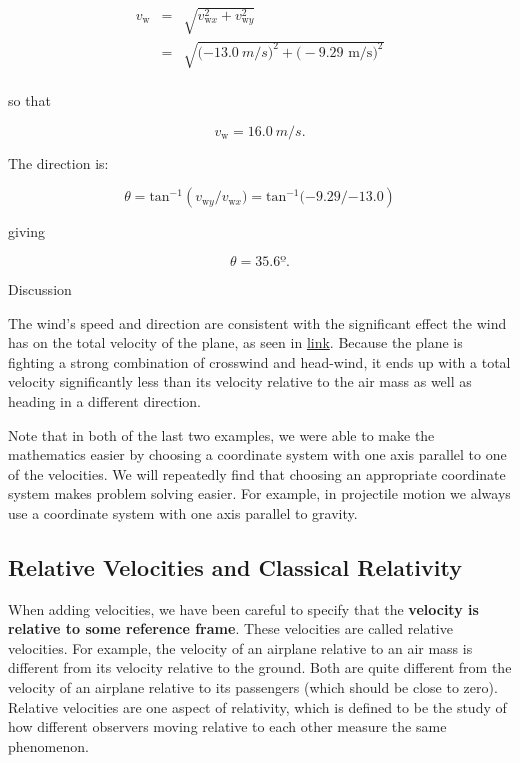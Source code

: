\documentclass[
]{book}
\newenvironment{tinysection}{}{}
\begin{document}
\leavevmode\hypertarget{eip-128}{}%
\[\begin{array}{lll}
v_{\text{w}} & = & \sqrt{v_{\text{w}x}^{2} + v_{\text{w}y}^{2}} \\
 & = & \sqrt{{( - \text{13}}\text{.}0\ m/s{{)^{2} + (} - 9}\text{.}\text{29\ m/s})^{2}} \\
\end{array}\]

so that

\leavevmode\hypertarget{eip-637}{}%
\[{{v_{\text{w}} = \text{16}}\text{.}0\ m/s\text{.}}{}\]

The direction is:

\leavevmode\hypertarget{eip-359}{}%
\[{{\theta = \text{tan}^{- 1}}({v_{\text{w}y}/v_{\text{w}x}}{) = \text{tan}^{- 1}}{( - 9}\text{.}{\text{29}/{- \text{13}}}\text{.}0)}{}\]

giving

\leavevmode\hypertarget{eip-955}{}%
\[{{\theta = \text{35}}\text{.}6º}\text{.}{}\]

\begin{tinysection}

{Discussion}

\end{tinysection}

The wind's speed and direction are consistent with the significant
effect the wind has on the total velocity of the plane, as seen in
\protect\hyperlink{import-auto-id1546060}{link}. Because the
plane is fighting a strong combination of crosswind and head-wind, it
ends up with a total velocity significantly less than its velocity
relative to the air mass as well as heading in a different direction.

Note that in both of the last two examples, we were able to make the
mathematics easier by choosing a coordinate system with one axis
parallel to one of the velocities. We will repeatedly find that choosing
an appropriate coordinate system makes problem solving easier. For
example, in projectile motion we always use a coordinate system with one
axis parallel to gravity.

\hypertarget{fs-id1969463}{}
\hypertarget{relative-velocities-and-classical-relativity}{%
\subsection{Relative Velocities and Classical Relativity}\label{relative-velocities-and-classical-relativity}}

When adding velocities, we have been careful to specify that the
\textbf{velocity is relative to some reference frame}. These velocities are
called \protect\hypertarget{import-auto-id1929302}{}{relative velocities}.
For example, the velocity of an airplane relative to an air mass is
different from its velocity relative to the ground. Both are quite
different from the velocity of an airplane relative to its passengers
(which should be close to zero). Relative velocities are one aspect of
\protect\hypertarget{import-auto-id1982113}{}{relativity}, which is defined
to be the study of how different observers moving relative to each other
measure the same phenomenon.
\end{document}
